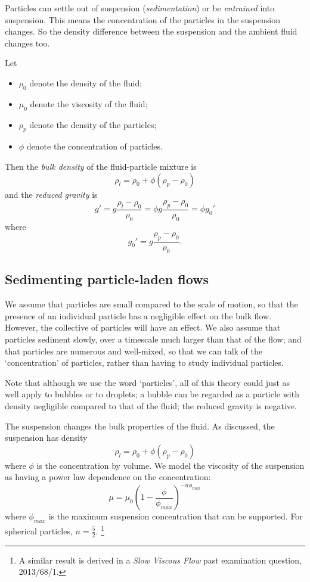Particles can settle out of suspension (\textit{sedimentation}) or be \textit{entrained} into suspension. This means the concentration of the particles in the suspension changes. So the density difference between the suspension and the ambient fluid changes too. 

Let
\begin{itemize}
 \item $\rho_0$ denote the density of the fluid;
 \item $\mu_0$ denote the viscosity of the fluid;
 \item $\rho_p$ denote the density of the particles;
 \item $\phi$ denote the concentration of particles.
\end{itemize}
Then the \textit{bulk density} of the fluid-particle mixture is
\begin{equation}
    \rho_l = \rho_0 + \phi (\rho_p - \rho_0) 
\end{equation}
and the \textit{reduced gravity} is
\begin{equation}
 g' = g \frac{\rho_l - \rho_0}{\rho_0} = \phi g \frac{\rho_p - \rho_0}{\rho_0} = \phi g_0'
\end{equation}
where
\begin{equation}
    g_0' = g \frac{\rho_p - \rho_0}{\rho_0}.
\end{equation}

\subsection{Sedimenting particle-laden flows}

We assume that particles are small compared to the scale of motion, so that the presence of an individual particle has a negligible effect on the bulk flow. However, the collective of particles will have an effect. We also assume that particles sediment slowly, over a timescale much larger than that of the flow; and that particles are numerous and well-mixed, so that we can talk of the `concentration' of particles, rather than having to study individual particles.

Note that although we use the word `particles', all of this theory could just as well apply to bubbles or to droplets; a bubble can be regarded as a particle with density negligible compared to that of the fluid; the reduced gravity is negative.

The suspension changes the bulk properties of the fluid. As discussed, the suspension has density
\begin{equation}
        \rho_l = \rho_0 + \phi (\rho_p - \rho_0)
\end{equation}
where $\phi$ is the concentration by volume. We model the viscosity of the suspension as having a power law dependence on the concentration: 
\begin{equation}
 \mu = \mu_0 \left( 1 - \frac{\phi}{\phi_{max}} \right)^{-n \phi_{max}}
\end{equation}
where $\phi_{max}$ is the maximum suspension concentration that can be supported. For spherical particles, $n = \frac{5}{2}$.
\footnote{A similar result is derived in a \textit{Slow Viscous Flow} past examination question, 2013/68/1.}


